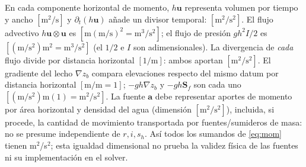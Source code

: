 \documentclass[11pt,a4paper]{article}
\begin{document}
En cada componente horizontal de momento, $h\boldsymbol u$ representa volumen por tiempo y ancho $[\mathrm{m^2/s}]$ y $\partial_t(h\boldsymbol u)$ añade un divisor temporal: $[\mathrm{m^2/s^2}]$. El flujo advectivo $h\boldsymbol u\otimes\boldsymbol u$ es $[\mathrm m(\mathrm{m/s})^2=\mathrm{m^3/s^2}]$; el flujo de presión $gh^2 I/2$ es $[(\mathrm{m/s^2})\mathrm{m^2}=\mathrm{m^3/s^2}]$ (el $1/2$ e $I$ son adimensionales). La divergencia de \emph{cada} flujo divide por distancia horizontal $[1/\mathrm m]$: ambos aportan $[\mathrm{m^2/s^2}]$. El gradiente del lecho $\nabla z_b$ compara elevaciones respecto del mismo datum por distancia horizontal $[\mathrm{m/m}=1]$; $-gh\nabla z_b$ y $-gh\boldsymbol S_f$ son cada uno $[(\mathrm{m/s^2})\mathrm m(1)=\mathrm{m^2/s^2}]$. La fuente $\boldsymbol a$ debe representar aportes de momento por área horizontal y densidad del agua (dimensión $[\mathrm{m^2/s^2}]$), incluida, si procede, la cantidad de movimiento transportada por fuentes/sumideros de masa: no se presume independiente de $r,i,s_h$. Así todos los sumandos de \eqref{eq:mom} tienen m$^2$/s$^2$; esta igualdad dimensional no prueba la validez física de las fuentes ni su implementación en el solver.
\end{document}
